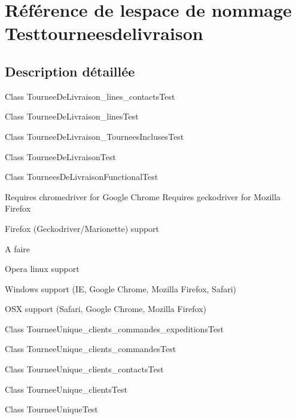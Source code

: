 \hypertarget{namespaceTesttourneesdelivraison}{}\section{Référence de l\textquotesingle{}espace de nommage Testtourneesdelivraison}
\label{namespaceTesttourneesdelivraison}


\subsection{Description détaillée}
Class Tournee\+De\+Livraison\+\_\+lines\+\_\+contacts\+Test

Class Tournee\+De\+Livraison\+\_\+lines\+Test

Class Tournee\+De\+Livraison\+\_\+\+Tournees\+Incluses\+Test

Class Tournee\+De\+Livraison\+Test

Class Tournees\+De\+Livraison\+Functional\+Test

Requires chromedriver for Google Chrome Requires geckodriver for Mozilla Firefox

Firefox (Geckodriver/\+Marionette) support \begin{DoxyRefDesc}{A faire}
\item[\hyperlink{todo__todo000001}{A faire}]Opera linux support 

Windows support (IE, Google Chrome, Mozilla Firefox, Safari) 

O\+SX support (Safari, Google Chrome, Mozilla Firefox)\end{DoxyRefDesc}


Class Tournee\+Unique\+\_\+clients\+\_\+commandes\+\_\+expeditions\+Test

Class Tournee\+Unique\+\_\+clients\+\_\+commandes\+Test

Class Tournee\+Unique\+\_\+clients\+\_\+contacts\+Test

Class Tournee\+Unique\+\_\+clients\+Test

Class Tournee\+Unique\+Test 